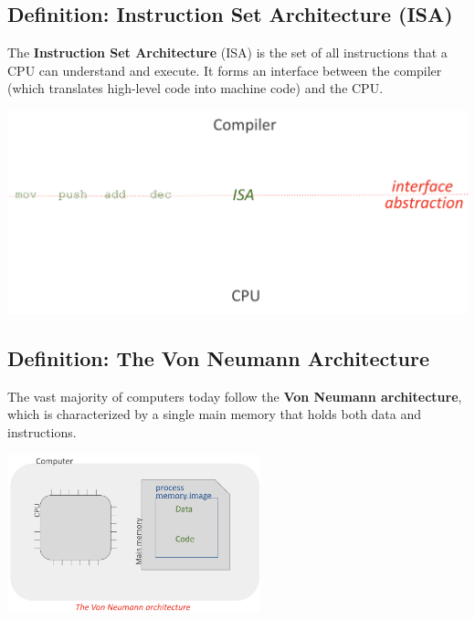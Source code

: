 \subsection{Definition: Instruction Set Architecture (ISA)}
\begin{minipage}{0.45\textwidth}
\begin{definition}[ISA]
The \textbf{Instruction Set Architecture} (ISA) is the set of all instructions that a CPU can understand and execute. It forms an interface between the compiler (which translates high-level code into machine code) and the CPU.
\end{definition}
\end{minipage}
\hfill
\vline
\hfill
\begin{minipage}{0.45\textwidth}
\begin{center}
  \includegraphics[width=1.25\textwidth]{chapters/L1/images/isa.png}
\end{center}
\end{minipage}

\subsection{Definition: The Von Neumann Architecture}

The vast majority of computers today follow the \textbf{Von Neumann architecture}, which is characterized by a single main memory that holds both data and instructions.

\begin{center}
  \includegraphics[width=0.55\textwidth]{chapters/L1/images/von.png}
\end{center}

